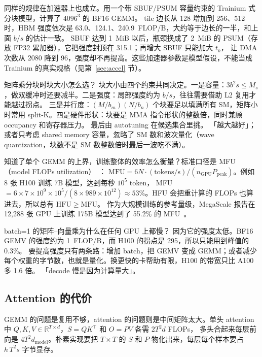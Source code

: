 同样的规律在加速器上也成立。用一个带 SBUF/PSUM 容量约束的 Trainium 式分块模型，计算了 $4096^3$ 的 BF16 GEMM。
tile 边长从 128 增加到 256、512 时，HBM 强度依次是 63.0、124.1、240.9~FLOP/B，大约等于边长的一半，和上面 $b/s$ 的估计一致。
SBUF 达到 1~MiB 以后，瓶颈换成了 2~MiB 的 PSUM（存放 FP32 累加器），它把强度封顶在 315.1；再增大 SBUF 只能加大 $t_k$，
让 DMA 次数从 2080 降到 96，强度却不再提高。这些加速器参数是模型假设，不能当成 Trainium 的真实规格（见第~\ref{sec:accel} 节）。

\begin{qa}{矩阵乘分块时块大小怎么选？}
\ans 块大小由四个约束共同决定。一是容量：$3b^2 s\le M_s$，做双缓冲时还要减半。二是强度：局部强度约为 $b/s$，往往需要借助 L2 复用才能越过拐点。
三是并行度：$(M/b_m)(N/b_n)$ 个块要足以填满所有 SM，矩阵小时常用 split-K。四是硬件形状：块要是 MMA 指令形状的整数倍，同时兼顾 occupancy 和寄存器压力。
最后由 autotuning 在候选集合里挑。
\wrong 「越大越好」；或者只考虑 shared memory 容量，忽略了 SM 数和波次量化（wave quantization，块数不是 SM 数整数倍时最后一波吃不满）。
\end{qa}

知道了单个 GEMM 的上界，训练整体的效率怎么衡量？标准口径是 MFU（model FLOPs utilization）~\cite{chowdhery2022palm}：
$\mathrm{MFU}=6N\cdot(\text{tokens/s})/(n_{\text{GPU}}P_{\text{peak}})$。例如 8 张 H100 训练 7B 模型，达到每秒 $10^5$ token，
MFU $=6\times7\times10^9\times10^5/(8\times989\times10^{12})\approx 53\%$。HFU 会把重计算的 FLOPs 也算进去，所以总有 $\mathrm{HFU}\ge\mathrm{MFU}$。
作为大规模训练的参考量级，MegaScale 报告在 12,288 张 GPU 上训练 175B 模型达到了 55.2\% 的 MFU~\cite{jiang2024megascale}。

\begin{qa}{batch=1 的矩阵--向量乘为什么在任何 GPU 上都慢？}
\ans 因为它的强度太低。BF16 GEMV 的强度约为 1~FLOP/B，而 H100 的拐点是 295，所以只能用到峰值的 0.3\%。
要提高强度只有两条路：增加 batch，把 GEMV 变成 GEMM；或者减少每个权重的字节数，也就是量化。换更快的卡帮助有限，H100 的带宽只比 A100 多 1.6 倍。
\wrong 「decode 慢是因为计算量大」。
\end{qa}

\subsection{Attention 的代价}

GEMM 的问题是复用不够，attention 的问题则是中间矩阵太大。单头 attention 中 $Q,K,V\in\mathbb{R}^{T\times d}$，$S=QK^\top$ 和 $O=PV$ 各需 $2T^2d$ FLOPs，
多头合起来每层前向是 $4T^2d_{\text{model}}$。朴素实现要把 $T\times T$ 的 $S$ 和 $P$ 物化出来，每层每个样本要占 $h\,T^2 s$ 字节显存。

